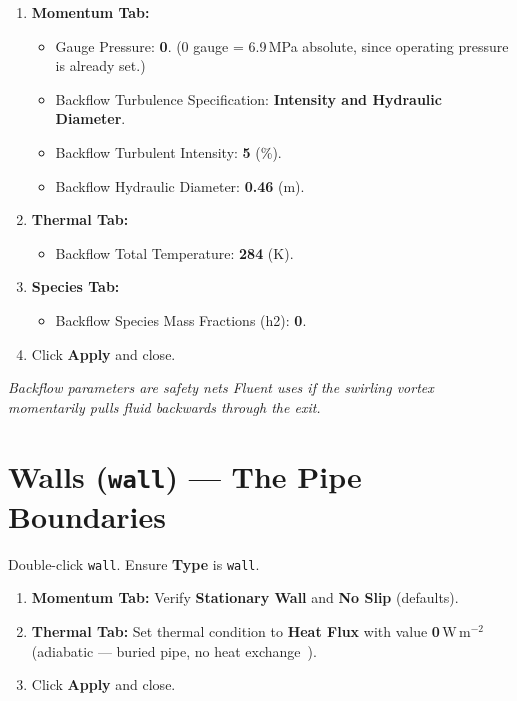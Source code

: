 \documentclass[12pt,a4paper]{report}
\begin{document}
\begin{enumerate}
  \item \textbf{Momentum Tab:}
  \begin{itemize}
    \item Gauge Pressure: \textbf{0}.  \quad(0 gauge = 6.9\,MPa
          absolute, since operating pressure is already set.)
    \item Backflow Turbulence Specification: \textbf{Intensity and
          Hydraulic Diameter}.
    \item Backflow Turbulent Intensity: \textbf{5} (\%).
    \item Backflow Hydraulic Diameter: \textbf{0.46} (m).
  \end{itemize}
  \item \textbf{Thermal Tab:}
  \begin{itemize}
    \item Backflow Total Temperature: \textbf{284} (K).
  \end{itemize}
  \item \textbf{Species Tab:}
  \begin{itemize}
    \item Backflow Species Mass Fractions (h2): \textbf{0}.
  \end{itemize}
  \item Click \textbf{Apply} and close.
\end{enumerate}

\noindent\textit{Backflow parameters are safety nets Fluent uses if the
swirling vortex momentarily pulls fluid backwards through the exit.}

\section{Walls (\texttt{wall}) --- The Pipe Boundaries}

Double-click \texttt{wall}.  Ensure \textbf{Type} is \texttt{wall}.

\begin{enumerate}
  \item \textbf{Momentum Tab:} Verify \textbf{Stationary Wall} and
        \textbf{No Slip} (defaults).
  \item \textbf{Thermal Tab:} Set thermal condition to \textbf{Heat
        Flux} with value \textbf{0}\,W\,m$^{-2}$ (adiabatic --- buried
        pipe, no heat exchange~\cite{Eames2022}).
  \item Click \textbf{Apply} and close.
\end{enumerate}
\end{document}
